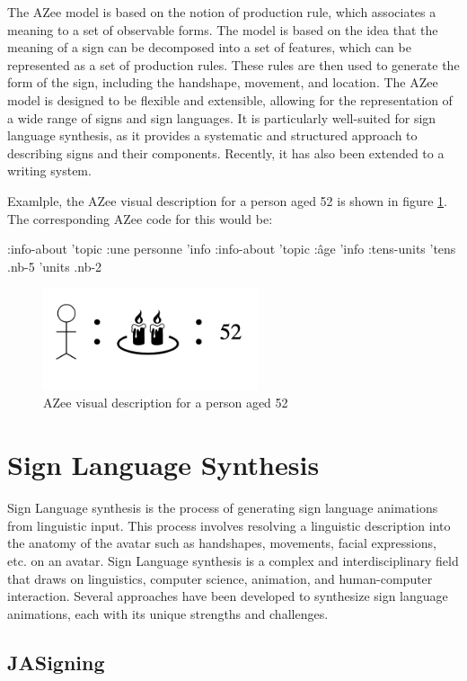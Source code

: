 \documentclass[../../main.tex]{subfiles}
\begin{document}
The AZee model is based on the notion of production rule, which associates a meaning to a set of observable forms. The model is based on the idea that the meaning of a sign can be decomposed into a set of features, which can be represented as a set of production rules. These rules are then used to generate the form of the sign, including the handshape, movement, and location. The AZee model is designed to be flexible and extensible, allowing for the representation of a wide range of signs and sign languages. It is particularly well-suited for sign language synthesis, as it provides a systematic and structured approach to describing signs and their components. Recently, it has also been extended to a writing system.

Examlple, the AZee visual description for a person aged 52 is shown in figure \ref{fig:azvd}. The corresponding AZee code for this would be:

:info-about
	'topic
	:une personne
	'info
	:info-about
		'topic
		:âge
		'info
		:tens-units
			'tens
			.nb-5
			'units
			.nb-2

\begin{figure}
  \centering \includegraphics[width = 2.5in]{chapters/background_work/images/azvd.png}
  \caption{AZee visual description for a person aged 52}
  \label{fig:azvd}
\end{figure}

\section{Sign Language Synthesis}

Sign Language synthesis is the process of generating sign language animations from linguistic input. This process involves resolving a linguistic description into the anatomy of the avatar such as handshapes, movements, facial expressions, etc. on an avatar.  Sign Language synthesis is a complex and interdisciplinary field that draws on linguistics, computer science, animation, and human-computer interaction. Several approaches have been developed to synthesize sign language animations, each with its unique strengths and challenges.

\subsection{JASigning}
\end{document}

